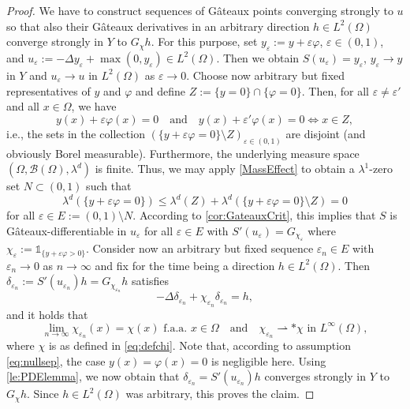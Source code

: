 \documentclass[reqno]{shinyart}
\begin{document}
\begin{proof}
    We have to construct sequences of G\^ateaux points converging strongly to $u$ so that 
    also their G\^ateaux derivatives in an arbitrary direction $h\in L^2(\Omega)$ converge strongly 
    in $Y$ to $G_\chi h$. For this purpose, set  $y_\varepsilon := y + \varepsilon \varphi$,
    $\varepsilon \in (0, 1)$, and 
    $u_\varepsilon := - \Delta y_\varepsilon + \max(0, y_\varepsilon) \in L^2(\Omega)$. 
    Then we obtain $S( u_\varepsilon) = y_\varepsilon$, $y_\varepsilon \to y$ in $Y$ and 
    $u_\varepsilon \to u$ in $L^2(\Omega)$ as $\varepsilon \to 0$. 
    Choose now arbitrary but fixed representatives of $y$ and $\varphi$ and 
    define $Z:= \{y = 0\} \cap \{\varphi = 0\}$. Then, for all $\varepsilon \neq \varepsilon'$ 
    and  all $x \in \Omega$, we have
    \begin{equation*}
        y(x) + \varepsilon \varphi(x) = 0 \quad\text{and}\quad  y(x) + \varepsilon' \varphi(x)=0 \iff x \in  Z,
    \end{equation*}
    i.e., the sets in the collection 
    $(\{y + \varepsilon \varphi =0\} \setminus Z)_{\varepsilon \in (0, 1)}$ are disjoint 
    (and obviously Borel measurable). 
    Furthermore, the underlying measure space $(\Omega, \mathcal{B}(\Omega), \lambda^d)$ is finite. 
    Thus, we may apply \cref{MassEffect} to obtain a $\lambda^1$-zero set 
    $N \subset (0, 1)$ such that
    \begin{equation*}
        \lambda^d(\{y + \varepsilon \varphi = 0\} )  
        \leq \lambda^d (Z) + \lambda^d(\{y + \varepsilon \varphi =0\} \setminus Z) = 0
    \end{equation*}
    for all $\varepsilon \in E := (0, 1) \setminus N$. 
    According to \cref{cor:GateauxCrit}, this implies that $S$ is G\^ateaux-differentiable 
    in $u_\varepsilon$ for all $\varepsilon \in E$ with 
    $S'(u_\varepsilon) = G_{\chi_\varepsilon}$ where 
    $\chi_\varepsilon := \mathbb{1}_{\{y + \varepsilon \varphi >0\}}$.
    Consider now an arbitrary but fixed sequence $\varepsilon_n \in E$ 
    with $\varepsilon_n \to 0$ as $n \to \infty$ 
    and fix for the time being a direction $h \in L^2(\Omega)$. 
    Then $\delta_{\varepsilon_n} := S'(u_{\varepsilon_n}) h = G_{\chi_{\varepsilon_n}} h$ satisfies
    \begin{equation*}
        -\Delta \delta_{\varepsilon_n}  +  \chi_{\varepsilon_n} \delta_{\varepsilon_n} = h, 
    \end{equation*}
    and it holds that
    \begin{equation*}
        \lim_{n \to \infty} \chi_{\varepsilon_n}(x) = \chi(x) \text{ f.a.a.\ } x\in \Omega 
        \quad \text{and} \quad 
        \chi_{\varepsilon_n} {\rightharpoonup}{*} \chi \text{ in }L^\infty(\Omega),
    \end{equation*}
    where $\chi$ is as defined in \eqref{eq:defchi}. Note that, according to assumption 
    \eqref{eq:nullsep}, the case $y(x)  = \varphi(x) = 0$ is negligible here. 
    Using \cref{le:PDElemma}, we now obtain that 
    $\delta_{\varepsilon_n} = S'(u_{\varepsilon_n})h$ converges strongly in $Y$ 
    to $G_\chi h$. Since $h\in L^2(\Omega)$ was arbitrary, this proves the claim. 
\end{proof}
\end{document}
